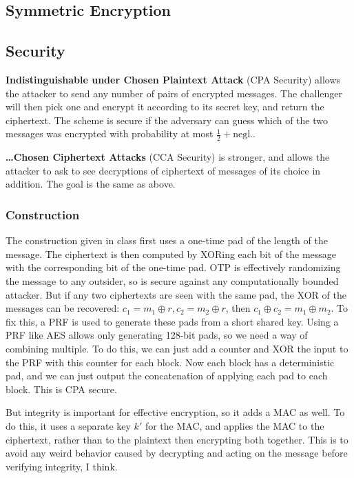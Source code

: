 \documentclass{article}
\begin{document}
\begin{multicols*}{2}
	\subsection{Symmetric Encryption}

	\subsection{Security}
	\textbf{Indistinguishable under Chosen Plaintext Attack} (CPA Security) allows the attacker to send any number of pairs of encrypted messages. The challenger will then pick one and encrypt it according to its secret key, and return the ciphertext. The scheme is secure if the adversary can guess which of the two messages was encrypted with probability at most $\frac{1}{2} + \text{negl.}.$

	\textbf{\ldots Chosen Ciphertext Attacks} (CCA Security) is stronger, and allows the attacker to ask to see decryptions of ciphertext of messages of its choice in addition. The goal is the same as above. 

	\subsubsection{Construction}
	The construction given in class first uses a one-time pad of the length of the message. The ciphertext is then computed by XORing each bit of the message with the corresponding bit of the one-time pad. OTP is effectively randomizing the message to any outsider, so is secure against any computationally bounded attacker. But if any two ciphertexts are seen with the same pad, the XOR of the messages can be recovered: $c_1 = m_1 \oplus r, c_2 = m_2 \oplus r$, then $c_1 \oplus c_2 = m_1 \oplus m_2$. To fix this, a PRF is used to generate these pads from a short shared key. Using a PRF like AES allows only generating 128-bit pads, so we need a way of combining multiple. To do this, we can just add a counter and XOR the input to the PRF with this counter for each block. Now each block has a deterministic pad, and we can just output the concatenation of applying each pad to each block. This is CPA secure.

	But integrity is important for effective encryption, so it adds a MAC as well. To do this, it uses a separate key $k'$ for the MAC, and applies the MAC to the ciphertext, rather than to the plaintext then encrypting both together. This is to avoid any weird behavior caused by decrypting and acting on the message before verifying integrity, I think.


\end{multicols*}
\end{document}
